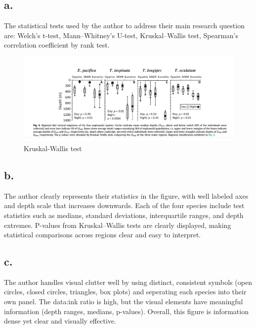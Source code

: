 \documentclass[
  letterpaper,
  DIV=11,
  numbers=noendperiod]{scrartcl}
\begin{document}
\subsection{a.}\label{a.-2}

The statistical tests used by the author to address their main research
question are: Welch's t-test, Mann--Whitney's U-test, Kruskal--Wallis
test, Spearman's correlation coefficient by rank test.

\begin{figure}[H]

{\centering \includegraphics{../statistical_test.png}

}

\caption{Kruskal-Wallis test}

\end{figure}%

\subsection{b.}\label{b.-2}

The author clearly represents their statistics in the figure, with well
labeled axes and depth scale that increases downwards. Each of the four
species include test statistics such as medians, standard deviations,
interquartile ranges, and depth extremes. P-values from Kruskal--Wallis
tests are clearly displayed, making statistical comparisons across
regions clear and easy to interpret.

\subsection{c.}\label{c.-2}

The author handles visual clutter well by using distinct, consistent
symbols (open circles, closed circles, triangles, box plots) and
seperating each species into their own panel. The data:ink ratio is
high, but the visual elements have meaningful information (depth ranges,
medians, p-values). Overall, this figure is information dense yet clear
and visually effective.
\end{document}
